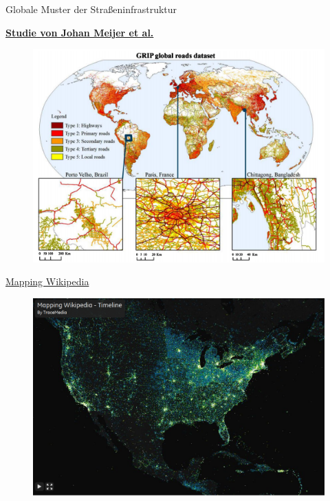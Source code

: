 \documentclass[ignorenonframetext,]{beamer}
\begin{document}
\begin{frame}{Globale Muster der Straßeninfrastruktur}

\begin{block}{\href{http://iopscience.iop.org/article/10.1088/1748-9326/aabd42/meta}{\textbf{Studie
von Johan Meijer et al.}}}

\begin{figure}
\centering
\includegraphics{figure/GRIP_globalroads.PNG}
\caption{}
\end{figure}

\end{block}

\end{frame}

\begin{frame}{\href{http://www.visualizing.org/visualizations/mapping-wikipedia-timeline}{Mapping
Wikipedia}}

\begin{figure}
\centering
\includegraphics{figure/LuminousUSA.PNG}
\caption{}
\end{figure}

\end{frame}
\end{document}
